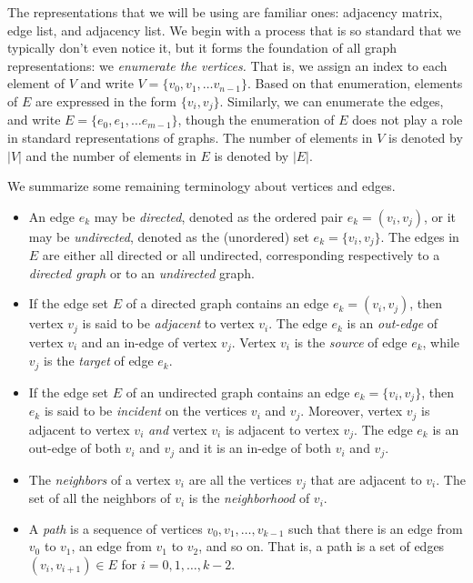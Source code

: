 The representations that we will be using are familiar ones: adjacency matrix, edge list, and adjacency list.
We begin with a process that is so standard that we typically don't even notice it, but it forms
the foundation of all graph representations: we \emph{enumerate the vertices.}  That is, we assign an
index to each element of $V$ and write $V = \{v_0, v_1, \ldots v_{n-1}\}$.  Based on that enumeration,
elements of $E$ are expressed in the form $\{v_i, v_j\}$.  Similarly, we can enumerate the edges, and write  
$E = \{ e_0, e_1, \ldots e_{m-1}\}$, though the enumeration of $E$ does not play a role in standard
representations of graphs.
%
The number of elements in $V$ is denoted by $|V|$ and the number of elements in $E$ is denoted by $|E|$.

We summarize some remaining terminology about vertices and edges.
\begin{itemize}
\item 
An edge $e_k$ may  be \emph{directed}, denoted as the ordered pair $e_k=(v_i, v_j)$, or it may be
  \emph{undirected}, denoted as the (unordered) set $e_k=\{v_i, v_j\}$.  The edges 
in $E$ are either all directed or all undirected,
  corresponding respectively to a \emph{directed graph} or to an \emph{undirected} graph.
\item 
If the edge set $E$ of a directed graph contains an edge $e_k = (v_i,v_j)$, then
  vertex $v_j$ is said to be \emph{adjacent} to vertex $v_i$.  The edge $e_k$ is an
  \emph{out-edge} of vertex $v_i$ and an in-edge of vertex $v_j$.  Vertex $v_i$ is the \emph{source} of
  edge $e_k$, while $v_j$ is the \emph{target} of edge $e_k$.
\item If the edge set $E$ of an undirected graph contains an edge $e_k = \{v_i,v_j\}$, then
  $e_k$ is said to be \emph{incident} on the vertices $v_i$ and $v_j$.
  Moreover, vertex $v_j$ is adjacent to vertex $v_i$
  \emph{and} vertex $v_i$ is adjacent to vertex $v_j$.
  The edge $e_k$ is an out-edge of both $v_i$ and $v_j$ and it is an in-edge of both $v_i$ and $v_j$.
\item The \emph{neighbors} of a vertex $v_i$ are all the vertices $v_j$ that are adjacent to $v_i$.  The set of all the neighbors of $v_i$ is the \emph{neighborhood} of $v_i$.
\item A \emph{path} is a sequence of vertices $v_0, v_1, \ldots, v_{k-1}$ such that
there is an edge from $v_0$ to $v_1$, an edge from $v_1$ to $v_2$, and so on.
That is, a path is a set of edges $(v_i, v_{i+1}) \in E$ for  $i = 0, 1, \ldots, k-2$.
\end{itemize}



